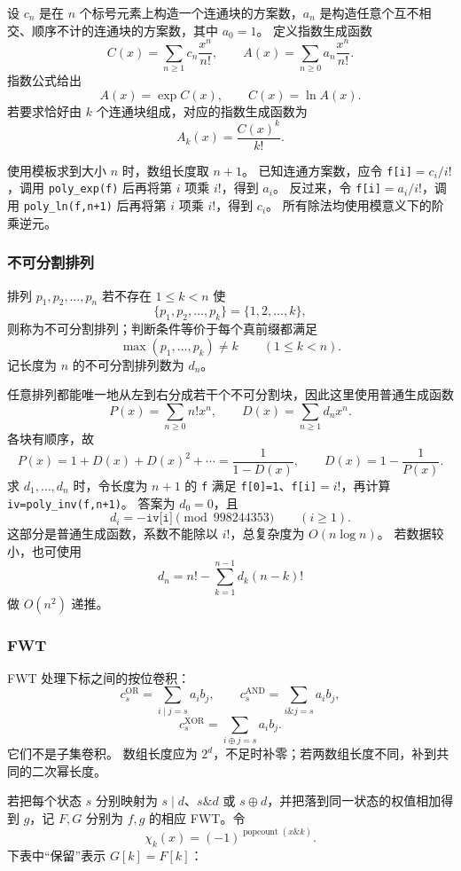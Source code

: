 设 $c_n$ 是在 $n$ 个标号元素上构造一个连通块的方案数，$a_n$ 是构造任意个互不相交、顺序不计的连通块的方案数，其中 $a_0=1$。
定义指数生成函数
\[
  C(x)=\sum_{n\ge1}c_n\frac{x^n}{n!},
  \qquad
  A(x)=\sum_{n\ge0}a_n\frac{x^n}{n!}.
\]
指数公式给出
\[
  A(x)=\exp C(x),
  \qquad
  C(x)=\ln A(x).
\]
若要求恰好由 $k$ 个连通块组成，对应的指数生成函数为
\[
  A_k(x)=\frac{C(x)^k}{k!}.
\]

使用模板求到大小 $n$ 时，数组长度取 $n+1$。
已知连通方案数，应令 \texttt{f[i]}$=c_i/i!$，调用 \texttt{poly\_exp(f)} 后再将第 $i$ 项乘 $i!$，得到 $a_i$。
反过来，令 \texttt{f[i]}$=a_i/i!$，调用 \texttt{poly\_ln(f,n+1)} 后再将第 $i$ 项乘 $i!$，得到 $c_i$。
所有除法均使用模意义下的阶乘逆元。

\subsubsection{不可分割排列}

排列 $p_1,p_2,\ldots,p_n$ 若不存在 $1\le k<n$ 使
\[
  \{p_1,p_2,\ldots,p_k\}=\{1,2,\ldots,k\},
\]
则称为不可分割排列；判断条件等价于每个真前缀都满足
\[
  \max(p_1,\ldots,p_k)\ne k
  \qquad(1\le k<n).
\]
记长度为 $n$ 的不可分割排列数为 $d_n$。

任意排列都能唯一地从左到右分成若干个不可分割块，因此这里使用普通生成函数
\[
  P(x)=\sum_{n\ge0}n!x^n,
  \qquad
  D(x)=\sum_{n\ge1}d_nx^n.
\]
各块有顺序，故
\[
  P(x)=1+D(x)+D(x)^2+\cdots=\frac1{1-D(x)},
  \qquad
  D(x)=1-\frac1{P(x)}.
\]
求 $d_1,\ldots,d_n$ 时，令长度为 $n+1$ 的 \texttt{f} 满足
\texttt{f[0]=1}、\texttt{f[i]}$=i!$，再计算
\texttt{iv=poly\_inv(f,n+1)}。
答案为 $d_0=0$，且
\[
  d_i=-\texttt{iv[i]}\pmod{998244353}\qquad(i\ge1).
\]
这部分是普通生成函数，系数不能除以 $i!$，总复杂度为 $O(n\log n)$。
若数据较小，也可使用
\[
  d_n=n!-\sum_{k=1}^{n-1}d_k(n-k)!
\]
做 $O(n^2)$ 递推。

\subsubsection{FWT}

FWT 处理下标之间的按位卷积：
\[
  c_s^{\mathrm{OR}}
  =\sum_{i\mathbin{|}j=s}a_i b_j,
  \qquad
  c_s^{\mathrm{AND}}
  =\sum_{i\mathbin{\&}j=s}a_i b_j,
\]
\[
  c_s^{\mathrm{XOR}}
  =\sum_{i\mathbin{\oplus}j=s}a_i b_j.
\]
它们不是子集卷积。
数组长度应为 $2^d$，不足时补零；若两数组长度不同，补到共同的二次幂长度。

若把每个状态 $s$ 分别映射为 $s\mathbin{|}d$、$s\mathbin{\&}d$ 或
$s\mathbin{\oplus}d$，并把落到同一状态的权值相加得到 $g$，记 $F,G$
分别为 $f,g$ 的相应 FWT。令
\[
  \chi_k(x)=(-1)^{\operatorname{popcount}(x\mathbin{\&}k)}.
\]
下表中“保留”表示 $G[k]=F[k]$：

